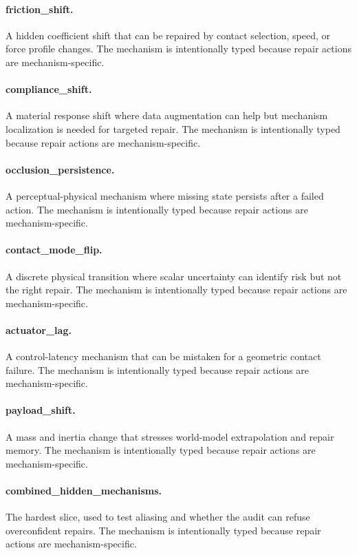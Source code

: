 \documentclass{article}
\begin{document}
\paragraph{friction\_shift.} A hidden coefficient shift that can be repaired by contact selection, speed, or force profile changes. The mechanism is intentionally typed because repair actions are mechanism-specific.
\paragraph{compliance\_shift.} A material response shift where data augmentation can help but mechanism localization is needed for targeted repair. The mechanism is intentionally typed because repair actions are mechanism-specific.
\paragraph{occlusion\_persistence.} A perceptual-physical mechanism where missing state persists after a failed action. The mechanism is intentionally typed because repair actions are mechanism-specific.
\paragraph{contact\_mode\_flip.} A discrete physical transition where scalar uncertainty can identify risk but not the right repair. The mechanism is intentionally typed because repair actions are mechanism-specific.
\paragraph{actuator\_lag.} A control-latency mechanism that can be mistaken for a geometric contact failure. The mechanism is intentionally typed because repair actions are mechanism-specific.
\paragraph{payload\_shift.} A mass and inertia change that stresses world-model extrapolation and repair memory. The mechanism is intentionally typed because repair actions are mechanism-specific.
\paragraph{combined\_hidden\_mechanisms.} The hardest slice, used to test aliasing and whether the audit can refuse overconfident repairs. The mechanism is intentionally typed because repair actions are mechanism-specific.
\end{document}
